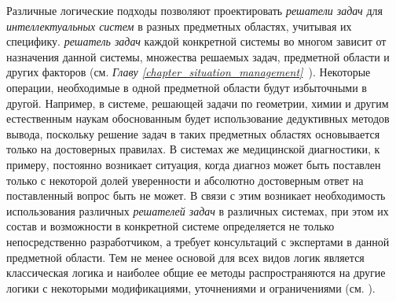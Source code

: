 Различные логические подходы позволяют проектировать \textit{решатели задач} для \textit{интеллектуальных систем} в разных предметных областях, учитывая их специфику. \textit{решатель задач} каждой конкретной системы во многом зависит от назначения данной системы, множества решаемых задач, предметной области и других факторов (см. \textit{Главу \ref{chapter_situation_management}~}). Некоторые операции, необходимые в одной предметной области будут избыточными в другой. Например, в системе, решающей задачи по геометрии, химии и другим естественным наукам обоснованным будет использование дедуктивных методов вывода, поскольку решение задач в таких предметных областях основывается только на достоверных правилах. В системах же медицинской диагностики, к примеру, постоянно возникает ситуация, когда диагноз может быть поставлен только с некоторой долей уверенности и абсолютно достоверным ответ на поставленный вопрос быть не может. В связи с этим возникает необходимость использования различных \textit{решателей задач} в различных системах, при этом их состав и возможности в конкретной системе определяется не только непосредственно разработчиком, а требует консультаций с экспертами в данной предметной области. Тем не менее основой для всех видов логик является классическая логика и наиболее общие ее методы распространяются на другие логики с некоторыми модификациями, уточнениями и ограничениями (см. ).

